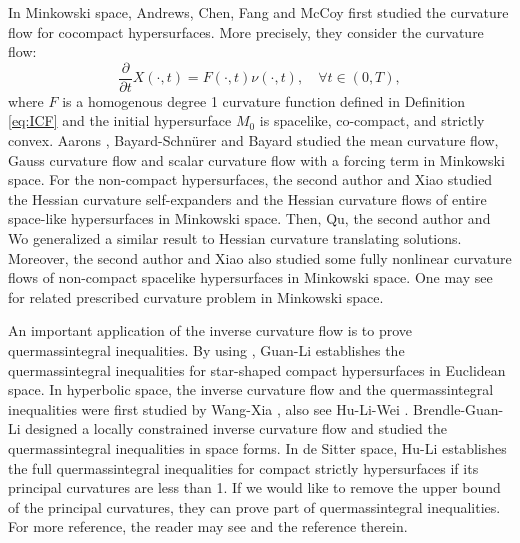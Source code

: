\documentclass[10pt,a4paper]{amsart}
\newcommand{\pd}[2]{\frac{\partial {#1}}{\partial {#2}}}
\numberwithin{equation}{section}
\begin{document}
In Minkowski space, Andrews, Chen, Fang and McCoy \cite{co-compact} first studied the curvature flow for cocompact hypersurfaces. More precisely, they consider the curvature flow:   
$$\pd{}{t}X(\cdot,t) = F(\cdot,t)\nu(\cdot,t),\quad \forall t\in (0,T), $$
 where $F$ is a homogenous degree 1 curvature function defined in Definition  \ref{eq:ICF}     
 and the initial hypersurface $M_0$ is spacelike, co-compact, and strictly convex. Aarons \cite{Aa}, Bayard-Schn\"{u}rer \cite{BS09} and Bayard \cite{B09} studied the mean curvature flow, Gauss curvature flow and scalar curvature flow with a forcing term in Minkowski space. For the non-compact hypersurfaces, the second author and Xiao \cite{WX22-1,WX22-2} studied the Hessian curvature self-expanders and the Hessian curvature flows of entire space-like hypersurfaces in Minkowski space. Then, Qu, the second author and Wo \cite{QWW24}  generalized a similar result to Hessian curvature translating solutions. Moreover, the second author and Xiao \cite{WX212} also studied some fully nonlinear curvature flows of non-compact spacelike hypersurfaces in Minkowski space. One may see \cite{RenWX19, RenWX20, WX20,WX21} for related prescribed curvature problem in Minkowski space.  

An important application of the inverse curvature flow is to prove quermassintegral inequalities. By using  \cite{Ger, Ur}, Guan-Li \cite{Guan2009} establishes the quermassintegral inequalities for star-shaped compact hypersurfaces in Euclidean space.  
In hyperbolic space, the inverse curvature flow and 
the quermassintegral inequalities were first studied by Wang-Xia \cite{WXia}, also see Hu-Li-Wei \cite{HLWei}. 
Brendle-Guan-Li \cite{BGL}  designed a locally constrained inverse curvature flow and studied the quermassintegral inequalities in space forms. In de Sitter space, Hu-Li \cite{HuLi} establishes the full quermassintegral inequalities for compact strictly hypersurfaces if its principal curvatures are less than 1. If we would like to remove the upper bound of the principal curvatures, they can prove part of quermassintegral inequalities. For more reference, the reader
may see \cite{CPLS, Sch, MaK, MaK2} and the reference therein.
\end{document}
